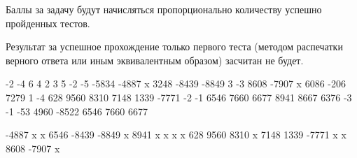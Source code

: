 \markSection

Баллы за задачу будут начисляться пропорционально количеству успешно пройденных тестов.

Результат за успешное прохождение только первого теста (методом распечатки верного ответа или иным эквивалентным образом) засчитан не будет.


\begin{myverbbox}[\small]{\vinput}
    -2 -4 6 4 2 3
    5
    -2 -5
    -5834	-4887	x
    3248	-8439	-8849
    3 -3
    8608	-7907	x
    6086	-206	7279
    1 -4
    628	9560	8310
    7148	1339	-7771
    -2 -1
    6546	7660	6677
    8941	8667	6376
    -3 -1
    -53	4960	-8522
    6546	7660	6677
\end{myverbbox}

\begin{myverbbox}[\small]{\voutput}
    -4887	x	x	6546	
    -8439	-8849	x	8941	
    x	x	x	x	
    628	9560	8310	x	
    7148	1339	-7771	x	
    x	8608	-7907	x	
\end{myverbbox}


